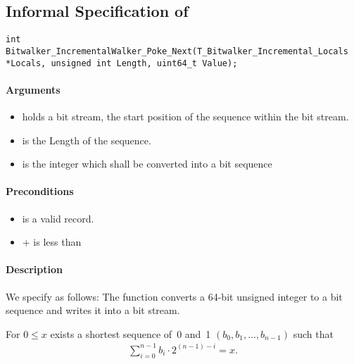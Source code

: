 
\clearpage

\subsection{Informal Specification of }
\begin{lstlisting}[style=acsl-block]
int		 Bitwalker_IncrementalWalker_Poke_Next(T_Bitwalker_Incremental_Locals *Locals, unsigned int Length, uint64_t Value);
\end{lstlisting}

\paragraph{Arguments}

\begin{itemize}
    \item  {} holds a bit stream, the start position of the sequence within the bit stream.
   \item {} is the Length of the sequence.
   \item {} is the integer which shall be converted into a bit sequence
\end{itemize}

\paragraph{Preconditions}
\begin{itemize}
    \item  {} is a valid record.
    \item {} +  is less than 
\end{itemize}

\paragraph{Description}

We specify \pokenext as follows:
The function \poke converts a 64-bit unsigned integer to a bit sequence and 
writes it into a bit stream.

For $0 \leq x$ exists a shortest sequence of~0 and~1
$(b_0, b_1,\ldots,b_{n - 1})$
such that
\begin{align}
    \sum_{i=0}^{n-1} b_i \cdot 2^{(n - 1) - i} = x.
\end{align}


